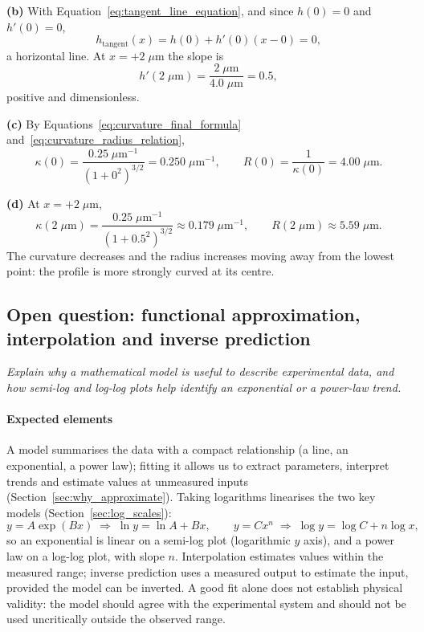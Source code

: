\textbf{(b)} With Equation~\eqref{eq:tangent_line_equation}, and since $h(0) = 0$ and $h'(0) = 0$,
\begin{equation*}
h_{\text{tangent}}(x) = h(0) + h'(0)(x - 0) = 0,
\end{equation*}
a horizontal line. At $x = +2\;\mu\text{m}$ the slope is
\begin{equation*}
h'(2\;\mu\text{m}) = \frac{2\;\mu\text{m}}{4.0\;\mu\text{m}} = 0.5,
\end{equation*}
positive and dimensionless.

\textbf{(c)} By Equations~\eqref{eq:curvature_final_formula} and~\eqref{eq:curvature_radius_relation},
\begin{equation*}
\kappa(0) = \frac{0.25\;\mu\text{m}^{-1}}{(1 + 0^2)^{3/2}} = 0.250\;\mu\text{m}^{-1}, \qquad R(0) = \frac{1}{\kappa(0)} = 4.00\;\mu\text{m}.
\end{equation*}

\textbf{(d)} At $x = +2\;\mu\text{m}$,
\begin{equation*}
\kappa(2\;\mu\text{m}) = \frac{0.25\;\mu\text{m}^{-1}}{(1 + 0.5^2)^{3/2}} \approx 0.179\;\mu\text{m}^{-1}, \qquad R(2\;\mu\text{m}) \approx 5.59\;\mu\text{m}.
\end{equation*}
The curvature decreases and the radius increases moving away from the lowest point: the profile is more strongly curved at its centre.

\subsection{Open question: functional approximation, interpolation and inverse prediction}

\emph{Explain why a mathematical model is useful to describe experimental data, and how semi-log and log-log plots help identify an exponential or a power-law trend.}

\paragraph{Expected elements} A model summarises the data with a compact relationship (a line, an exponential, a power law); fitting it allows us to extract parameters, interpret trends and estimate values at unmeasured inputs (Section~\ref{sec:why_approximate}). Taking logarithms linearises the two key models (Section~\ref{sec:log_scales}):
\begin{equation*}
y = A\exp(Bx) \;\Rightarrow\; \ln y = \ln A + Bx, \qquad y = Cx^n \;\Rightarrow\; \log y = \log C + n\log x,
\end{equation*}
so an exponential is linear on a semi-log plot (logarithmic $y$ axis), and a power law on a log-log plot, with slope $n$. Interpolation estimates values within the measured range; inverse prediction uses a measured output to estimate the input, provided the model can be inverted. A good fit alone does not establish physical validity: the model should agree with the experimental system and should not be used uncritically outside the observed range.

